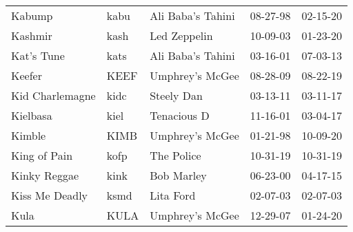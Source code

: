 \begin{longtable}{p{}p{}p{}p{}p{}}
                                                                  Kabump &          kabu &                                        Ali Baba's Tahini &              08-27-98 &             02-15-20 \\
                                                                 Kashmir &          kash &                                             Led Zeppelin &              10-09-03 &             01-23-20 \\
                                                              Kat's Tune &          kats &                                        Ali Baba's Tahini &              03-16-01 &             07-03-13 \\
                                                                  Keefer &          KEEF &                                          Umphrey's McGee &              08-28-09 &             08-22-19 \\
                                                         Kid Charlemagne &          kidc &                                               Steely Dan &              03-13-11 &             03-11-17 \\
                                                                Kielbasa &          kiel &                                              Tenacious D &              11-16-01 &             03-04-17 \\
                                                                  Kimble &          KIMB &                                          Umphrey's McGee &              01-21-98 &             10-09-20 \\
                                                            King of Pain &          kofp &                                               The Police &              10-31-19 &             10-31-19 \\
                                                            Kinky Reggae &          kink &                                               Bob Marley &              06-23-00 &             04-17-15 \\
                                                          Kiss Me Deadly &          ksmd &                                                Lita Ford &              02-07-03 &             02-07-03 \\
                                                                    Kula &          KULA &                                          Umphrey's McGee &              12-29-07 &             01-24-20 \\

\end{longtable}
